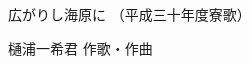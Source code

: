 \documentclass[10pt,b5j]{tarticle} %
\begin{document}
\begin{minipage}[c]{0.7\hsize} %
    \begin{center}
        {\LARGE
            広がりし海原に %
        }
        {\small 
            （平成三十年度寮歌） %
        }
    \end{center}
\end{minipage}
\begin{minipage}[c]{0.3\hsize} %
    \begin{flushright} %
        樋浦一希君 作歌・作曲 %
    \end{flushright}
\end{minipage}
\end{document}
